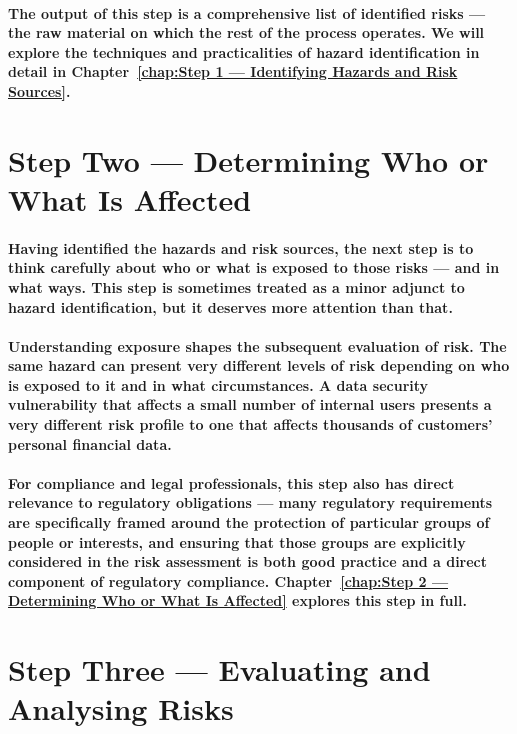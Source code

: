 \paragraph{The output of this step is a comprehensive list of identified risks — the raw material on which the rest of the process operates. We will explore the techniques and practicalities of hazard identification in detail in Chapter~\ref{chap:Step 1 — Identifying Hazards and Risk Sources}.}

\section{Step Two — Determining Who or What Is Affected}
\paragraph{Having identified the hazards and risk sources, the next step is to think carefully about who or what is exposed to those risks — and in what ways. This step is sometimes treated as a minor adjunct to hazard identification, but it deserves more attention than that.}
\paragraph{Understanding exposure shapes the subsequent evaluation of risk. The same hazard can present very different levels of risk depending on who is exposed to it and in what circumstances. A data security vulnerability that affects a small number of internal users presents a very different risk profile to one that affects thousands of customers' personal financial data.}
\paragraph{For compliance and legal professionals, this step also has direct relevance to regulatory obligations — many regulatory requirements are specifically framed around the protection of particular groups of people or interests, and ensuring that those groups are explicitly considered in the risk assessment is both good practice and a direct component of regulatory compliance. Chapter~\ref{chap:Step 2 — Determining Who or What Is Affected} explores this step in full.}

\section{Step Three — Evaluating and Analysing Risks}

